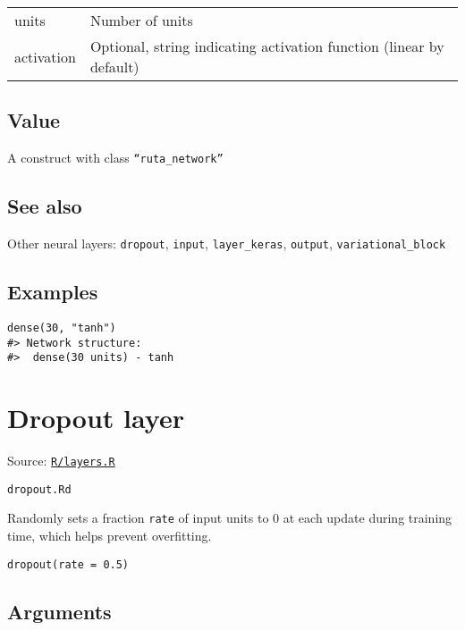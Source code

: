 \begin{longtable}[c]{@{}>{\small}p{3cm}>{\raggedright}p{12.5cm}@{}}
\toprule
units & Number of units\tabularnewline
activation & Optional, string indicating activation function (linear by
default)\tabularnewline
\bottomrule
\end{longtable}

\hypertarget{value}{\subsection{\texorpdfstring{\protect\hyperlink{value}{}Value}{Value}}\label{value}}

A construct with class \texttt{``ruta\_network''}

\hypertarget{see-also}{\subsection{\texorpdfstring{\protect\hyperlink{see-also}{}See
also}{See also}}\label{see-also}}

Other neural layers: \texttt{dropout}, \texttt{input},
\texttt{layer\_keras}, \texttt{output}, \texttt{variational\_block}

\hypertarget{examples}{\subsection{\texorpdfstring{\protect\hyperlink{examples}{}Examples}{Examples}}\label{examples}}

\begin{verbatim}
dense(30, "tanh")
#> Network structure:
#>  dense(30 units) - tanh
\end{verbatim}

\section{Dropout layer}\label{dropout-layer}

Source:
\href{https://github.com/fdavidcl/ruta/blob/master/R/layers.R}{\texttt{R/layers.R}}

\texttt{dropout.Rd}

Randomly sets a fraction \texttt{rate} of input units to 0 at each
update during training time, which helps prevent overfitting.

\begin{verbatim}
dropout(rate = 0.5)
\end{verbatim}

\hypertarget{arguments}{\subsection{\texorpdfstring{\protect\hyperlink{arguments}{}Arguments}{Arguments}}\label{arguments}}


